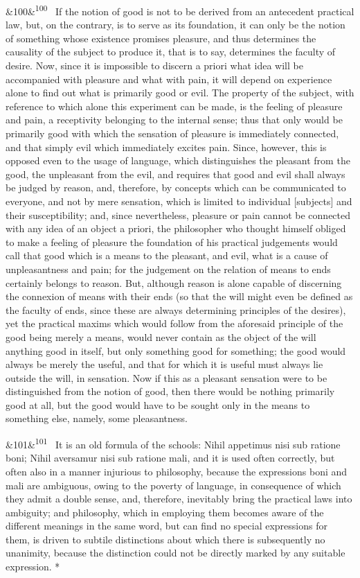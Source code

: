 \documentclass[12pt]{article}
\newcommand{\para}[1][]{\par\noindent\ifx&#1&\else\textsuperscript{\footnotesize #1}~\fi}
\begin{document}
\para[100] If the notion of good is not to be derived from an antecedent practical law, but, on the contrary, is to serve as its foundation, it can only be the notion of something whose existence promises pleasure, and thus determines the causality of the subject to produce it, that is to say, determines the faculty of desire. Now, since it is impossible to discern a priori what idea will be accompanied with pleasure and what with pain, it will depend on experience alone to find out what is primarily good or evil. The property of the subject, with reference to which alone this experiment can be made, is the feeling of pleasure and pain, a receptivity belonging to the internal sense; thus that only would be primarily good with which the sensation of pleasure is immediately connected, and that simply evil which immediately excites pain. Since, however, this is opposed even to the usage of language, which distinguishes the pleasant from the good, the unpleasant from the evil, and requires that good and evil shall always be judged by reason, and, therefore, by concepts which can be communicated to everyone, and not by mere sensation, which is limited to individual [subjects] and their susceptibility; and, since nevertheless, pleasure or pain cannot be connected with any idea of an object a priori, the philosopher who thought himself obliged to make a feeling of pleasure the foundation of his practical judgements would call that good which is a means to the pleasant, and evil, what is a cause of unpleasantness and pain; for the judgement on the relation of means to ends certainly belongs to reason. But, although reason is alone capable of discerning the connexion of means with their ends (so that the will might even be defined as the faculty of ends, since these are always determining principles of the desires), yet the practical maxims which would follow from the aforesaid principle of the good being merely a means, would never contain as the object of the will anything good in itself, but only something good for something; the good would always be merely the useful, and that for which it is useful must always lie outside the will, in sensation. Now if this as a pleasant sensation were to be distinguished from the notion of good, then there would be nothing primarily good at all, but the good would have to be sought only in the means to something else, namely, some pleasantness.

\para[101] It is an old formula of the schools: Nihil appetimus nisi sub ratione boni; Nihil aversamur nisi sub ratione mali, and it is used often correctly, but often also in a manner injurious to philosophy, because the expressions boni and mali are ambiguous, owing to the poverty of language, in consequence of which they admit a double sense, and, therefore, inevitably bring the practical laws into ambiguity; and philosophy, which in employing them becomes aware of the different meanings in the same word, but can find no special expressions for them, is driven to subtile distinctions about which there is subsequently no unanimity, because the distinction could not be directly marked by any suitable expression. *
\end{document}
